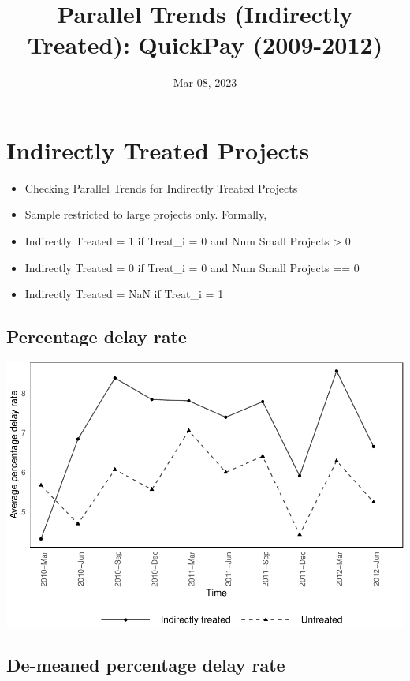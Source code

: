 \documentclass[
]{article}
\title{Parallel Trends (Indirectly Treated): QuickPay (2009-2012)}
\author{}
\date{\vspace{-2.5em}Mar 08, 2023}
\providecommand{\tightlist}{%
  \setlength{\itemsep}{0pt}\setlength{\parskip}{0pt}}
\begin{document}
\maketitle

\hypertarget{indirectly-treated-projects}{%
\section{Indirectly Treated
Projects}\label{indirectly-treated-projects}}

\begin{itemize}
\tightlist
\item
  Checking Parallel Trends for Indirectly Treated Projects
\item
  Sample restricted to large projects only. Formally,
\item
  Indirectly Treated = 1 if Treat\_i = 0 and Num Small Projects
  \textgreater{} 0
\item
  Indirectly Treated = 0 if Treat\_i = 0 and Num Small Projects == 0
\item
  Indirectly Treated = NaN if Treat\_i = 1
\end{itemize}

\hypertarget{percentage-delay-rate}{%
\subsection{Percentage delay rate}\label{percentage-delay-rate}}

\includegraphics{parallel_trends_indirect_treat_files/figure-latex/raw_percentage_delay_plot-1.pdf}

\hypertarget{de-meaned-percentage-delay-rate}{%
\subsection{De-meaned percentage delay
rate}\label{de-meaned-percentage-delay-rate}}
\end{document}
